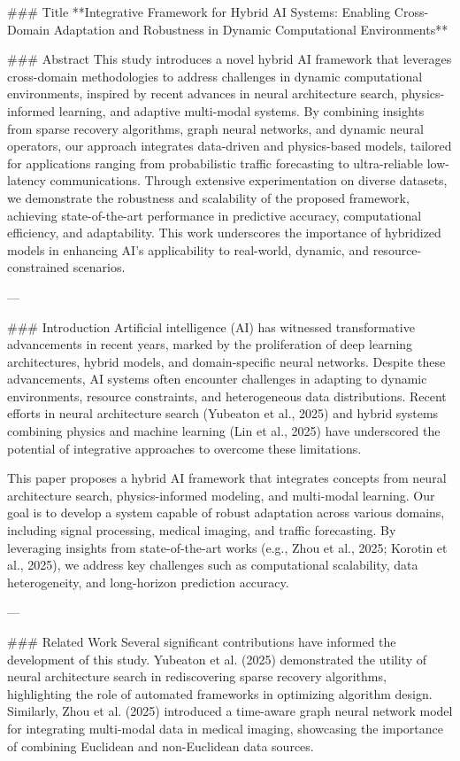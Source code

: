 ### Title
**Integrative Framework for Hybrid AI Systems: Enabling Cross-Domain Adaptation and Robustness in Dynamic Computational Environments**

### Abstract
This study introduces a novel hybrid AI framework that leverages cross-domain methodologies to address challenges in dynamic computational environments, inspired by recent advances in neural architecture search, physics-informed learning, and adaptive multi-modal systems. By combining insights from sparse recovery algorithms, graph neural networks, and dynamic neural operators, our approach integrates data-driven and physics-based models, tailored for applications ranging from probabilistic traffic forecasting to ultra-reliable low-latency communications. Through extensive experimentation on diverse datasets, we demonstrate the robustness and scalability of the proposed framework, achieving state-of-the-art performance in predictive accuracy, computational efficiency, and adaptability. This work underscores the importance of hybridized models in enhancing AI's applicability to real-world, dynamic, and resource-constrained scenarios.

---

### Introduction
Artificial intelligence (AI) has witnessed transformative advancements in recent years, marked by the proliferation of deep learning architectures, hybrid models, and domain-specific neural networks. Despite these advancements, AI systems often encounter challenges in adapting to dynamic environments, resource constraints, and heterogeneous data distributions. Recent efforts in neural architecture search (Yubeaton et al., 2025) and hybrid systems combining physics and machine learning (Lin et al., 2025) have underscored the potential of integrative approaches to overcome these limitations.

This paper proposes a hybrid AI framework that integrates concepts from neural architecture search, physics-informed modeling, and multi-modal learning. Our goal is to develop a system capable of robust adaptation across various domains, including signal processing, medical imaging, and traffic forecasting. By leveraging insights from state-of-the-art works (e.g., Zhou et al., 2025; Korotin et al., 2025), we address key challenges such as computational scalability, data heterogeneity, and long-horizon prediction accuracy. 

---

### Related Work
Several significant contributions have informed the development of this study. Yubeaton et al. (2025) demonstrated the utility of neural architecture search in rediscovering sparse recovery algorithms, highlighting the role of automated frameworks in optimizing algorithm design. Similarly, Zhou et al. (2025) introduced a time-aware graph neural network model for integrating multi-modal data in medical imaging, showcasing the importance of combining Euclidean and non-Euclidean data sources.

